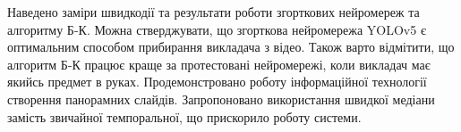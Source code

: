 \chapterConclusion

Наведено заміри швидкодії та результати роботи згорткових нейромереж та алгоритму Б-К. 
Можна стверджувати, що згорткова нейромережа YOLOv5 є оптимальним способом
прибирання викладача з відео. Також варто відмітити, що алгоритм Б-К
працює краще за протестовані нейромережі,
коли викладач має якийсь предмет в руках. Продемонстровано роботу інформаційної
технології створення панорамних слайдів. Запропоновано використання швидкої 
медіани замість звичайної темпоральної, що прискорило роботу системи.
